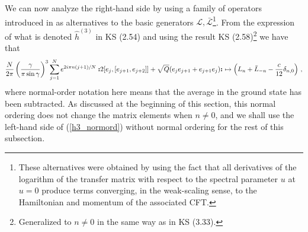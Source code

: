 \documentclass[a4paper,10pt]{article}
\newcommand{\linnea}[1]{$\framebox{\tiny L}$\ \textbf{\texttt{{\color{red}\footnotesize#1}}}}
\newcommand{\KSgen}{\mathcal{L}}
\newcommand{\normord}[1]{\boldsymbol{:}\mathrel{#1}\boldsymbol{:}}
\begin{document}
%
We can now analyze the right-hand side by using a family of operators introduced in \cite{KooSaleur} as alternatives to the basic generators $\KSgen,\bar{\KSgen}$\footnote{These alternatives  were obtained by using the fact that all derivatives of the logarithm of the transfer matrix with respect to the spectral parameter $u$ at $u=0$ produce terms converging, in the weak-scaling sense, to the Hamiltonian and momentum of the associated CFT.}. From the expression of  what is denoted  $\hat{h}^{(3)}$ in KS (2.54) and using the result KS (2.58)\footnote{Generalized to $n\neq 0$ in the same way as in KS (3.33).} we have that 
%
%
%
\begin{equation}\label{h3_normord}
{N\over2\pi}\left({\gamma\over\pi\sin\gamma}\right)^3 \sum_{j=1}^{N}e^{2i\pi n(j+1)/N} \normord{2[e_j,[e_{j+1},e_{j+2}]] + \sqrt{Q}(e_je_{j+1} + e_{j+1}e_j)}~  \mapsto \left( L_n + \bar{L}_{-n}  -\frac{c}{12}\delta_{n,0} \right) \,,
\end{equation}
%
where normal-order notation here  means that  the average in the ground state has been subtracted.
As discussed at the beginning of this section, this normal ordering does not change the matrix elements when $n \neq 0$, and we shall use the left-hand side of (\ref{h3_normord}) without normal ordering for the rest of this subsection.
\end{document}
